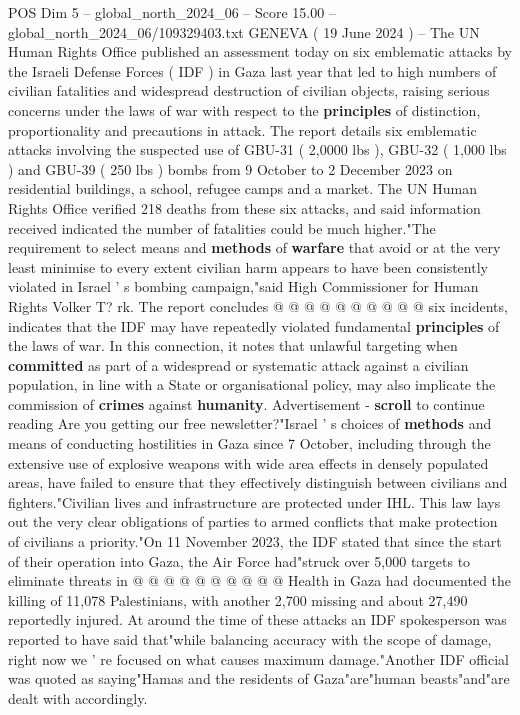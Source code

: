 \begin{textsample}{POS Dim 5 – global\_north\_2024\_06 – Score 15.00 – global\_north\_2024\_06/109329403.txt}  \label{ex:f5_pos_318}
GENEVA ( 19 June 2024 ) -- The UN Human Rights Office published an assessment today on six emblematic attacks by the Israeli Defense Forces ( IDF ) in Gaza last year that led to high numbers of civilian fatalities and widespread destruction of civilian objects, raising serious concerns under the laws of war with respect to the \textbf{principles} of distinction, proportionality and precautions in attack.
The report details six emblematic attacks involving the suspected use of GBU-31 ( 2,0000 lbs ), GBU-32 ( 1,000 lbs ) and GBU-39 ( 250 lbs ) bombs from 9 October to 2 December 2023 on residential buildings, a school, refugee camps and a market.
The UN Human Rights Office verified 218 deaths from these six attacks, and said information received indicated the number of fatalities could be much higher."The requirement to select means and \textbf{methods} of \textbf{warfare} that avoid or at the very least minimise to every extent civilian harm appears to have been consistently violated in Israel ' s bombing campaign,"said High Commissioner for Human Rights Volker T? rk.
The report concludes @ @ @ @ @ @ @ @ @ @ six incidents, indicates that the IDF may have repeatedly violated fundamental \textbf{principles} of the laws of war.
In this connection, it notes that unlawful targeting when \textbf{committed} as part of a widespread or systematic attack against a civilian population, in line with a State or organisational policy, may also implicate the commission of \textbf{crimes} against \textbf{humanity}.
Advertisement - \textbf{scroll} to continue reading Are you getting our free newsletter?"Israel ' s choices of \textbf{methods} and means of conducting hostilities in Gaza since 7 October, including through the extensive use of explosive weapons with wide area effects in densely populated areas, have failed to ensure that they effectively distinguish between civilians and fighters."Civilian lives and infrastructure are protected under IHL.
This law lays out the very clear obligations of parties to armed conflicts that make protection of civilians a priority."On 11 November 2023, the IDF stated that since the start of their operation into Gaza, the Air Force had"struck over 5,000 targets to eliminate threats in @ @ @ @ @ @ @ @ @ @ Health in Gaza had documented the killing of 11,078 Palestinians, with another 2,700 missing and about 27,490 reportedly injured.
At around the time of these attacks an IDF spokesperson was reported to have said that"while balancing accuracy with the scope of damage, right now we ' re focused on what causes maximum damage."Another IDF official was quoted as saying"Hamas and the residents of Gaza"are"human beasts"and"are dealt with accordingly.

\end{textsample}
